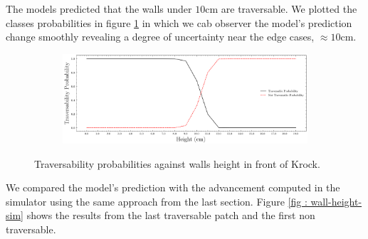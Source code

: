 The models predicted that the walls under $10$cm are traversable. We plotted the classes probabilities in figure \ref{fig : walls-height-preds} in which we cab observer the model's prediction change smoothly revealing a degree of uncertainty near the edge cases, $\approx 10$cm.
\begin{figure}[htbp]
    \centering
\begin{subfigure}[b]{1\linewidth}
    \includegraphics[width=\linewidth]{../img/5/custom_patches/walls_increasing/predictions.png}
    \end{subfigure}
    \caption{Traversability probabilities against walls height in front of Krock.}
\label{fig : walls-height-preds}
\end{figure}
We compared the model's prediction with the advancement computed in the simulator using the same approach from the last section. Figure \ref{fig : wall-height-sim} shows the results from the last traversable patch and the first non traversable.

